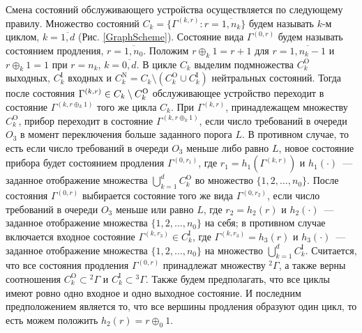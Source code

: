 Смена состояний обслуживающего устройства осуществляется по следующему правилу. Множество состояний $C_k = \{\Gamma^{(k, r)} \colon r=\overline{1, n_k}\}$ будем называть $k$-м циклом,  $k=\overline{1, d}$ (Рис. \ref{GraphScheme}). Состояние вида $\Gamma^{(0, r)}$ будем называть состоянием продления,  $r=\overline{1, n_0}$. Положим $r \oplus_k 1 = r+1$ для $r=\overline{1, n_k-1}$ и $r \oplus_k 1 = 1$ при $r=n_k$,  $k = \overline{0, d}$. В цикле $C_k$ выделим подмножества $C_k^{\mathrm{O}}$ выходных,  $C_k^{\mathrm{I}}$ входных и $C_k^{\mathrm{N}} = C_k \setminus (C_k^{\mathrm{O}} \cup C_k^{\mathrm{I}})$ нейтральных состояний. Тогда после состояния $\Gamma^{(k, r)} \hm\in C_k\setminus C_k^{\mathrm{O}}$ обслуживающее устройство переходит в состояние $\Gamma^{(k, r \oplus_k 1)}$ того же цикла $C_k$. При $\Gamma^{(k, r)}$,  принадлежащем множеству $C_k^{\mathrm{O}}$,  прибор переходит в состояние $\Gamma^{(k, r \oplus_k 1)}$,  если число требований в очереди $O_3$ в момент переключения больше заданного порога $L$. В противном случае,  то есть если число требований в очереди $O_3$ меньше либо равно $L$,  новое состояние прибора будет состоянием продления $\Gamma^{(0, r_1)}$,  где $r_1=h_1(\Gamma^{(k, r)})$ и $h_1(\cdot)$~--- заданное отображение множества $\bigcup\limits_{k=1}^d C_k^{\mathrm{O}}$ во множество $\{1, 2, \ldots,  n_0\}$. После состояния $\Gamma^{(0, r)}$ выбирается состояние того же вида $\Gamma^{(0, r_2)}$,  если число требований в очереди $O_3$ меньше или равно $L$,  где $r_2=h_2(r)$ и $h_2(\cdot)$~--- заданное отображение множества $\{1, 2,  \ldots,  n_0\}$ на себя; в противном случае включается входное состояние $\Gamma^{(k, r_3)} \in C_k^{\mathrm{I}}$,  где $\Gamma^{(k, r_3)}=h_3(r)$ и $h_3(\cdot)$~--- заданное отображение множества $\{1, 2,  \ldots,  n_0\}$ на множество  $\bigcup\limits_{k=1}^d C_k^{\mathrm{I}}$. Считается,  что все состояния продления $\Gamma^{(0, r)}$ принадлежат множеству ${}^2 \Gamma$,  а также верны соотношения $C_k^\mathrm{O}\subset {}^2 \Gamma$ и $C_k^\mathrm{I}\subset {}^3 \Gamma$. Также будем предполагать,  что все циклы имеют ровно одно входное и одно выходное состояние. И последним предположением является то,  что все вершины продления образуют один цикл,  то есть можем положить $h_2(r)=r\oplus_0 1$.

